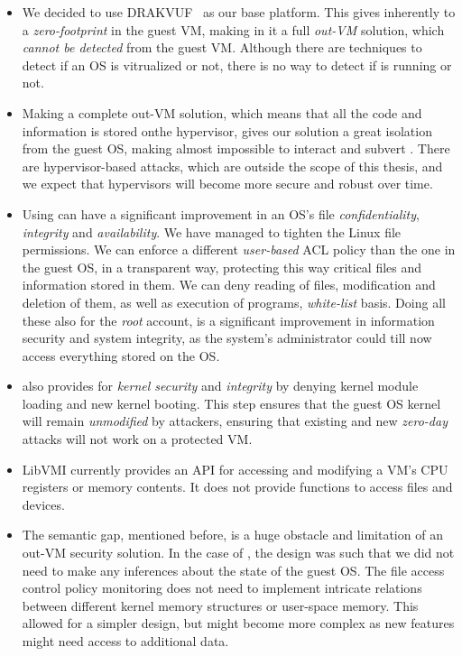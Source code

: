 \begin{itemize}
\item We decided to use DRAKVUF~\cite{lengyel2014drakvuf} as our base platform. This gives inherently to  a \emph{zero-footprint} in the guest \ac{VM}, making in it a full \emph{out-\ac{VM}} solution, which \emph{cannot be detected} from the guest \ac{VM}. Although there are techniques to detect if an \ac{OS} is vitrualized or not, there is no way to detect if  is running or not.

\item Making  a complete out-\ac{VM} solution, which means that all the code and information is stored onthe hypervisor, gives our solution a great isolation from the guest \ac{OS}, making almost impossible to interact and subvert . There are hypervisor-based attacks, which are outside the scope of this thesis, and we expect that hypervisors will become more secure and robust over time.

\item Using  can have a significant improvement in an \ac{OS}'s file \emph{confidentiality}, \emph{integrity} and \emph{availability}. We have managed to tighten the Linux file permissions. We can enforce a different \emph{user-based}  \ac{ACL} policy than the one in the guest \ac{OS}, in a transparent way, protecting this way critical files and information stored in them. We can deny reading of files, modification and deletion of them, as well as execution of programs,  \emph{white-list} basis. Doing all these also for the \emph{root} account, is a significant improvement in information security and system integrity, as the system's administrator could till now access everything stored on the \ac{OS}.

\item {} also provides for \emph{kernel security} and \emph{integrity} by denying kernel module loading and new kernel booting. This step ensures that the guest \ac{OS} kernel will remain \emph{unmodified} by attackers, ensuring that existing and new \emph{zero-day} attacks will not work on a  protected \ac{VM}.

\item LibVMI currently provides an \ac{API} for accessing and modifying a \ac{VM}'s \ac{CPU} registers or memory contents. It does not provide functions to access files and devices. 

\item The semantic gap, mentioned before, is a huge obstacle and limitation of an out-\ac{VM} security solution. In the case of , the design was such that we did not need to make any inferences about the state of the guest \ac{OS}. The file access control policy monitoring does not need to implement intricate relations between different kernel memory structures or user-space memory. This allowed for a simpler design, but might become more complex as new features might need access to additional data.
 
\end{itemize} 


